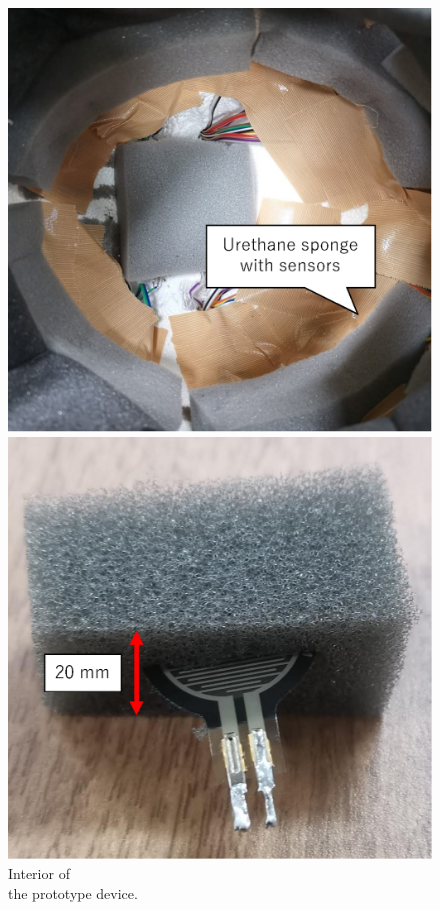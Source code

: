 \documentclass[english,preprint,JIP]{ipsj}
\begin{document}
\begin{figure}[!t]
\begin{minipage}{0.48\hsize}
\begin{center}
        \includegraphics[width=1\linewidth]{figure/met_in.eps}
  \end{center}
  \caption{Interior of\\the prototype device.}
  \label{fig:met_in}
  \end{minipage}
\begin{minipage}{0.48\hsize}
\begin{center}
        \includegraphics[width=1\linewidth]{figure/sensor.eps}

\end{center}
\end{minipage}
\end{figure}
\end{document}

